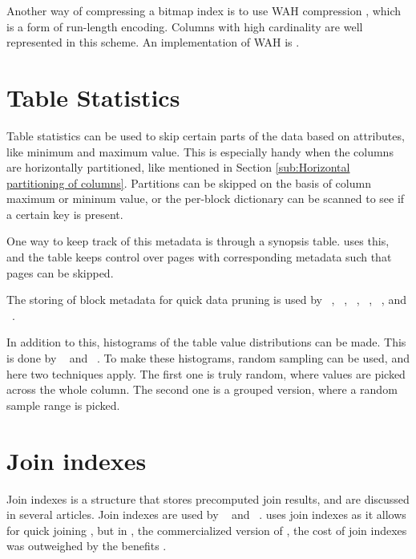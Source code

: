 Another way of compressing a bitmap index is to use WAH compression \cite{Bjorklund2011-wh}, which is a form of run-length encoding. Columns with high cardinality are well represented in this scheme. An implementation of WAH is .


\section{Table Statistics}
\label{sec:Table Statistics}
Table statistics can be used to skip certain parts of the data based on attributes, like minimum and maximum value. This is especially handy when the columns are horizontally partitioned, like mentioned in Section \ref{sub:Horizontal partitioning of columns}. Partitions can be skipped on the basis of column maximum or mininum value, or the per-block dictionary can be scanned to see if a certain key is present.

One way to keep track of this metadata is through a synopsis table. \ibm uses this, and the table keeps control over pages with corresponding metadata such that pages can be skipped.

The storing of block metadata for quick data pruning is used by \oracle~\cite{Lahiri2015-mz}, \ibm~\cite{Roman2013-em}, \vertica~\cite{Lamb2012-kg}, \monetx~\cite{Boncz2005-wj}, \mssql~\cite{Larson2013-mc}, and \exasol~\cite{Exasol2014-xh}.

In addition to this, histograms of the table value distributions can be made. This is done by \ibm~\cite{Raman2013-em, Raman2008-gi} and \mssql~\cite{Larson2013-mc}. To make these histograms, random sampling can be used, and here two techniques apply. The first one is truly random, where values are picked across the whole column. The second one is a grouped version, where a random sample range is picked.

\section{Join indexes}
\label{sec:Join indexes}
Join indexes is a structure that stores precomputed join results, and are discussed in several articles. Join indexes are used by \monetdb~\cite{Boncz2002-yj} and \monetx~\cite{Boncz2005-wj}.  \cstore uses join indexes as it allows for quick joining \cite{Stonebraker2005-qz}, but in \vertica, the commercialized version of \cstore, the cost of join indexes was outweighed by the benefits \cite{Lamb2012-kg}.

